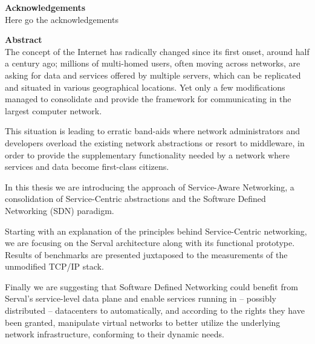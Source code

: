 \documentclass[12pt,a4paper,oneside]{article}
\begin{document}


{}



\newpage
\thispagestyle{empty}
{\Large \bf \noindent Acknowledgements}
\\Here go the acknowledgements


\newpage
\thispagestyle{empty}
{\Large \bf \noindent Abstract} \\[0.13cm]

\noindent The concept of the Internet has radically changed since its first onset, around half a century ago; millions of multi-homed users, often moving across networks, are asking for data and services offered by multiple servers, which can be replicated and situated in various geographical locations.
Yet only a few modifications managed to consolidate and provide the framework for communicating in the largest computer network.

This situation is leading to erratic band-aids where network administrators and developers overload the existing network abstractions or resort to middleware, in order to provide the supplementary functionality needed by a network where services and data become first-class citizens.

In this thesis we are introducing the approach of Service-Aware Networking, a consolidation of Service-Centric abstractions and the Software Defined Networking (SDN) paradigm.

Starting with an explanation of the principles behind Service-Centric networking, we are focusing on the Serval architecture along with its functional prototype.
Results of benchmarks are presented juxtaposed to the measurements of the unmodified TCP/IP stack.

Finally we are suggesting that Software Defined Networking could benefit from Serval's service-level data plane and enable services running in – possibly distributed – datacenters to automatically, and according to the rights they have been granted, manipulate virtual networks to better utilize the underlying network infrastructure, conforming to their dynamic needs.\\[0.1cm]
\end{document}
